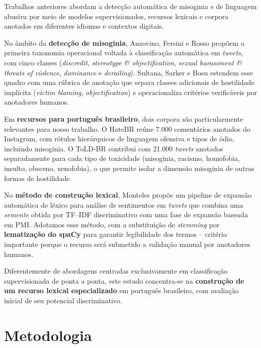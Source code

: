 \documentclass[12pt]{article}
\begin{document}
Trabalhos anteriores abordam a detec\c{c}\~ao autom\'atica de misoginia
e de linguagem abusiva por meio de modelos supervisionados, recursos
lexicais e corpora anotados em diferentes idiomas e contextos digitais.

No \^ambito da \textbf{detec\c{c}\~ao de misoginia}, Anzovino, Fersini e
Rosso \cite{anzovino2018} prop\~oem a primeira taxonomia operacional
voltada \`a classifica\c{c}\~ao autom\'atica em \emph{tweets}, com cinco
classes (\emph{discredit}, \emph{stereotype \& objectification},
\emph{sexual harassment \& threats of violence}, \emph{dominance} e
\emph{derailing}). Sultana, Sarker e Bosu \cite{sultana2021} estendem esse
quadro com uma r\'ubrica de anota\c{c}\~ao que separa classes adicionais
de hostilidade impl\'icita (\emph{victim blaming}, \emph{objectification})
e operacionaliza crit\'erios verific\'aveis por anotadores humanos.

Em \textbf{recursos para portugu\^es brasileiro}, dois corpora s\~ao
particularmente relevantes para nosso trabalho. O HateBR
\cite{vargas2022hatebr} re\'une 7.000 coment\'arios anotados do
Instagram, com r\'otulos hier\'arquicos de linguagem ofensiva e tipos de
\'odio, incluindo misoginia. O ToLD-BR \cite{leite2020toldbr} contribui
com 21.000 \emph{tweets} anotados separadamente para cada tipo de
toxicidade (misoginia, racismo, homofobia, insulto, obsceno, xenofobia),
o que permite isolar a dimens\~ao misoginia de outras formas de
hostilidade.

No \textbf{m\'etodo de constru\c{c}\~ao lexical}, Monteles
\cite{monteles2023} prop\~oe um pipeline de expans\~ao autom\'atica de
l\'exico para an\'alise de sentimentos em \emph{tweets} que combina uma
\emph{semente} obtida por TF--IDF discriminativo com uma fase de
expans\~ao baseada em PMI. Adotamos esse m\'etodo, com a substitui\c{c}\~ao
de \emph{stemming} por \textbf{lematiza\c{c}\~ao do spaCy}
\cite{honnibal2017spacy} para garantir legibilidade dos termos --
crit\'erio importante porque o recurso ser\'a submetido a valida\c{c}\~ao
manual por anotadores humanos.

Diferentemente de abordagens centradas exclusivamente em classifica\c{c}\~ao
supervisionada de ponta a ponta, este estudo concentra-se na
\textbf{constru\c{c}\~ao de um recurso lexical especializado} em
portugu\^es brasileiro, com avalia\c{c}\~ao inicial de seu potencial
discriminativo.

\section{Metodologia}
\end{document}
